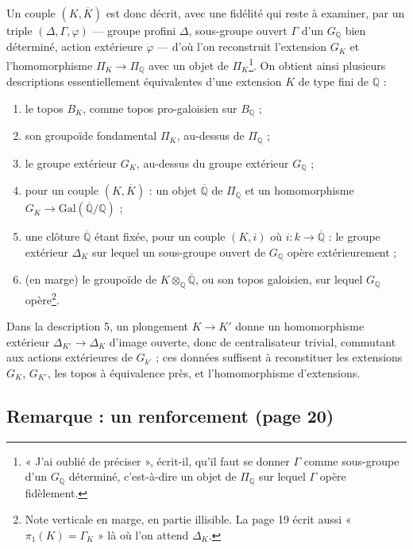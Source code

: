 \documentclass[11pt,a4paper]{article}
\begin{document}
Un couple $(K, \overline{K})$ est donc décrit, avec une fidélité qui reste à
examiner, par un triple $(\Delta, \Gamma, \varphi)$ — groupe profini $\Delta$,
sous-groupe ouvert $\Gamma$ d'un $G_{\mathbb{Q}}$ bien déterminé, action
extérieure $\varphi$ — d'où l'on reconstruit l'extension $G_K$ et
l'homomorphisme $\Pi_K \to \Pi_{\mathbb{Q}}$ avec un objet de
$\Pi_K$\footnote{« J'ai oublié de préciser », écrit-il, qu'il faut se donner
$\Gamma$ comme sous-groupe d'un $G_{\mathbb{Q}}$ déterminé, c'est-à-dire un
objet de $\Pi_{\mathbb{Q}}$ sur lequel $\Gamma$ opère fidèlement.}. On
obtient ainsi plusieurs descriptions essentiellement équivalentes d'une
extension $K$ de type fini de $\mathbb{Q}$ :
\begin{enumerate}
\item le topos $B_K$, comme topos pro-galoisien sur $B_{\mathbb{Q}}$ ;
\item son groupoïde fondamental $\Pi_K$, au-dessus de $\Pi_{\mathbb{Q}}$ ;
\item le groupe extérieur $G_K$, au-dessus du groupe extérieur
$G_{\mathbb{Q}}$ ;
\item pour un couple $(K, \overline{K})$ : un objet $\overline{\mathbb{Q}}$ de
$\Pi_{\mathbb{Q}}$ et un homomorphisme $G_K \to
\mathrm{Gal}(\overline{\mathbb{Q}}/\mathbb{Q})$ ;
\item une clôture $\overline{\mathbb{Q}}$ étant fixée, pour un couple $(K,
i)$ où $i : k \to \overline{\mathbb{Q}}$ : le groupe extérieur $\Delta_K$ sur
lequel un sous-groupe ouvert de $G_{\mathbb{Q}}$ opère extérieurement ;
\item (en marge) le groupoïde de $K \otimes_{\mathbb{Q}} \overline{\mathbb{Q}}$,
ou son topos galoisien, sur lequel $G_{\mathbb{Q}}$ opère\footnote{Note
verticale en marge, en partie illisible. La page 19 écrit aussi « $\pi_1(K) =
\Gamma_K$ » là où l'on attend $\Delta_K$.}.
\end{enumerate}
Dans la description 5, un plongement $K \to K'$ donne un homomorphisme
extérieur $\Delta_{K'} \to \Delta_K$ d'image ouverte, donc de centralisateur
trivial, commutant aux actions extérieures de $G_{k'}$ ; ces données suffisent
à reconstituer les extensions $G_K$, $G_{K'}$, les topos à équivalence près,
et l'homomorphisme d'extensions.

\subsection*{Remarque : un renforcement (page 20)}
\end{document}
